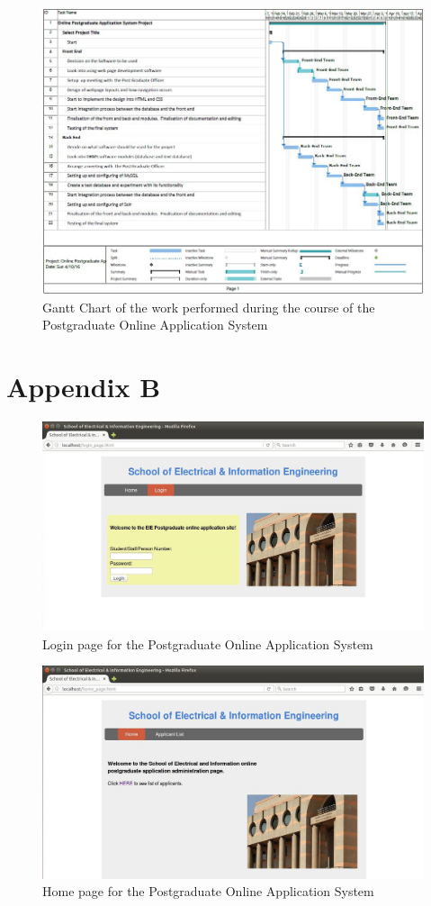 \documentclass[journal]{IEEEtran}
\begin{document}
\begin{figure}[hbt]
\centering
\includegraphics[width=0.7\linewidth]{GanttChart}
\caption{Gantt Chart of the work performed during the course of the Postgraduate Online Application System}
\label{GanttChart}
\end{figure}


\clearpage


\section*{Appendix B}

\begin{figure}[hbt]
\centering
\includegraphics[width=0.7\linewidth]{loginpage}
\caption{Login page for the Postgraduate Online Application System}
\label{LoginPage}
\end{figure}

\begin{figure}[hbt]
\centering
\includegraphics[width=0.7\linewidth]{home}
\caption{Home page for the Postgraduate Online Application System}
\label{HomePage}
\end{figure}
\end{document}
